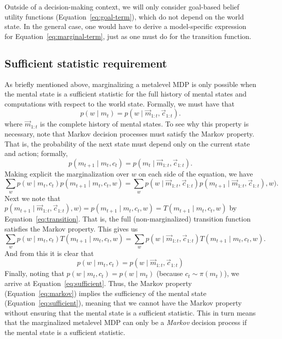 Outside of a decision-making context, we will only consider goal-based belief utility functions (Equation~\ref{eq:goal-term}), which do not depend on the world state. In the general case, one would have to derive a model-specific expression for Equation~\ref{eq:marginal-term}, just as one must do for the transition function.

\subsection{Sufficient statistic requirement}\label{sec:metamdp-sufficient}

As briefly mentioned above, marginalizing a metalevel MDP is only possible when the mental state is a sufficient statistic for the full history of mental states and computations with respect to the world state. Formally, we must have that
%
\begin{equation}\label{eq:sufficient}
  p(w \mid m_t) = p(w \mid \vec{m}_{1:t}, \vec{c}_{1:t}).
\end{equation}
%
where $\vec{m}_{1:t}$ is the complete history of mental states. To see why this property is necessary, note that Markov decision processes must satisfy the Markov property. That is, the probability of the next state must depend only on the current state and action; formally,
\begin{equation}\label{eq:markov}
  p(m_{t+1} \mid m_t, c_t) = p(m_t \mid \vec{m}_{1:t}, \vec{c}_{1:t}).
\end{equation}
Making explicit the marginalization over $w$ on each side of the equation, we have
\begin{equation}
  \sum_w p(w \mid m_t, c_t) p(m_{t+1} \mid m_t, c_t, w) =
  \sum_w p(w \mid \vec{m}_{1:t}, \vec{c}_{1:t}) p(m_{t+1} \mid \vec{m}_{1:t}, \vec{c}_{1:t}), w).
\end{equation}
Next we note that $p(m_{t+1} \mid \vec{m}_{1:t}, \vec{c}_{1:t}), w) = p(m_{t+1} \mid m_t, c_t, w) = T(m_{t+1} \mid m_t, c_t, w)$ by Equation~\ref{eq:transition}. That is, the full (non-marginalized) transition function satisfies the Markov property. This gives us
\begin{equation}
  \sum_w p(w \mid m_t, c_t) T(m_{t+1} \mid m_t, c_t, w) =
  \sum_w p(w \mid \vec{m}_{1:t}, \vec{c}_{1:t}) T(m_{t+1} \mid m_t, c_t, w).
\end{equation}
And from this it is clear that 
%
\begin{equation}
  p(w \mid m_t, c_t) = p(w \mid \vec{m}_{1:t}, \vec{c}_{1:t})
\end{equation}
%
Finally, noting that $p(w \mid m_t, c_t) = p(w \mid m_t)$ (because $c_t \sim \pi(m_t)$), we arrive at Equation~\ref{eq:sufficient}. Thus, the Markov property (Equation~\ref{eq:markov}) implies the sufficiency of the mental state (Equation~\ref{eq:sufficient}), meaning that we cannot have the Markov property without ensuring that the mental state is a sufficient statistic. This in turn means that the marginalized metalevel MDP can only be a \emph{Markov} decision process if the mental state is a sufficient statistic.

